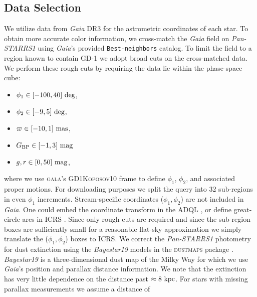 \documentclass[twocolumn]{aastex631}
\newcommand{\code}[1]{\textsc{#1}}
\newcommand{\package}[1]{\code{#1}}
\newcommand{\stream}[1]{#1}
\newcommand{\dataarchive}[1]{\textit{#1}}
\newcommand{\Gaia}{\dataarchive{Gaia}}
\newcommand{\PanStarrs}{\dataarchive{Pan-STARRS1}}
\newcommand{\parallax}{\varpi}
\begin{document}
    \subsection{Data Selection} \label{sub:results_gd1:data}

        We utilize data from \Gaia{} DR3 for the astrometric coordinates of each
        star.  To obtain more accurate color information, we cross-match the
        \Gaia{} field on \PanStarrs{} \citep{PanSTARRS1} using \Gaia's provided
        \texttt{Best-neighbors} catalog.  To limit the field to a region known
        to contain \stream{GD-1} we adopt broad cuts on the cross-matched data.
        We perform these rough cuts by requiring the data lie within the
        phase-space cube:
        \begin{itemize}
            \setlength\itemsep{0em}
            \item $\phi_1 \in [-100, 40] \ \rm{deg}$,
            \item $\phi_2 \in [-9, 5] \ \rm{deg}$,
            \item $\parallax \in [-10, 1] \ \rm{mas}$,
            \item $G_{\rm BP} \in [-1, 3] \ \rm{mag}$
            \item $g, r \in [0, 50] \ \rm{mag}$, %
        \end{itemize}
        where we use \package{gala}'s \citep{gala, galav1.3} \code{GD1Koposov10}
        frame \citep{Koposov+2010} to define $\phi_1$, $\phi_2$, and associated
        proper motions.  For downloading purposes we split the query into 32
        sub-regions in even $\phi_1$ increments.  Stream-specific coordinates
        ($\phi_1, \phi_2$) are not included in \Gaia.  One could embed the
        coordinate transform in the ADQL \citep{ADQL2.0}, or define great-circle
        arcs in ICRS \citep{ICRS1997}. Since only rough cuts are required and
        since the sub-region boxes are sufficiently small for a reasonable
        flat-sky approximation  we simply translate the ($\phi_1, \phi_2$) boxes
        to ICRS.  We correct the \PanStarrs{} photometry for dust extinction
        using the \textit{Bayestar19} \citep{Green+2019} models in the
        \package{dustmaps} package \citep{Green2018}.  \textit{Bayestar19} is a
        three-dimensional dust map of the Milky Way for which we use \Gaia's
        position and parallax distance information. We note that the extinction
        has very little dependence on the distance past $\approx 8 \ \rm{kpc}$.
        For stars with missing parallax measurements we assume a distance of
\end{document}
